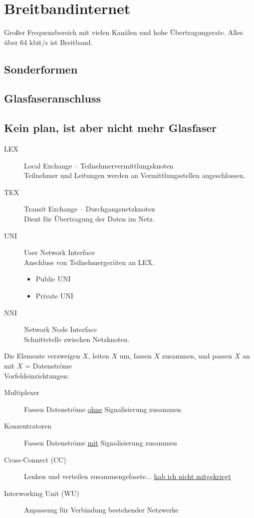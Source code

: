 \documentclass{scrartcl}
\begin{document}
\section{Breitbandinternet}

Großer Frequenzbereich mit vielen Kanälen und hohe Übertragungsrate. Alles über 64 kbit/s ist Breitband.

\subsection{Sonderformen}
\subsection{Glasfaseranschluss}

\subsection{Kein plan, ist aber nicht mehr Glasfaser}

\begin{description}
	\item [LEX] Local Exchange -- Teilnehmervermittlungsknoten\\
		Teilnehmer und Leitungen werden an Vermittlungsstellen angeschlossen.
	\item [TEX] Transit Exchange -- Durchgangsnetzknoten\\
		Dient für Übertragung der Daten im Netz.
	\item [UNI] User Network Interface\\
		Anschluss von Teilnehmergeräten an LEX.
		\begin{itemize}
			\item Public UNI \item Private UNI
		\end{itemize}
	\item [NNI] Network Node Interface\\
		Schnittstelle zwischen Netzknoten.
\end{description}

Die Elemente verzweigen $X$, leiten $X$ um, fassen $X$ zusammen, und passen $X$ an\\mit $X$ = Datenströme
\\

\noindent
Vorfeldeinrichtungen:
\begin{description}
	\item [Multiplexer] Fassen Datenströme \underline{ohne} Signalisierung zusammen
	\item [Konzentratoren] Fassen Datenströme \underline{mit} Signalisierung zusammen
	\item [Cross-Connect (CC)] Lenken und verteilen zusammengefasste... \underline{hab ich nicht mitgekriegt}
	\item [Interworking Unit (WU)] Anpassung für Verbindung bestehender Netzwerke
\end{description}
\end{document}
